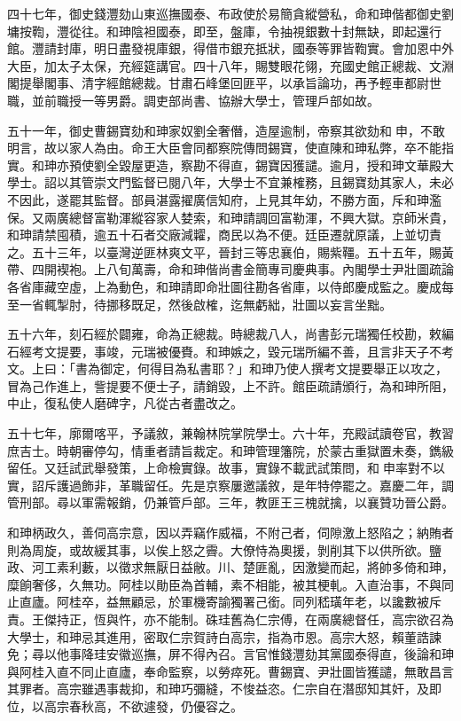 \begin{pinyinscope}
四十七年，御史錢灃劾山東巡撫國泰、布政使於易簡貪縱營私，命和珅偕都御史劉墉按鞫，灃從往。和珅陰袒國泰，即至，盤庫，令抽視銀數十封無缺，即起還行館。灃請封庫，明日盡發視庫銀，得借市銀充抵狀，國泰等罪皆鞫實。會加恩中外大臣，加太子太保，充經筵講官。四十八年，賜雙眼花翎，充國史館正總裁、文淵閣提舉閣事、清字經館總裁。甘肅石峰堡回匪平，以承旨論功，再予輕車都尉世職，並前職授一等男爵。調吏部尚書、協辦大學士，管理戶部如故。

五十一年，御史曹錫寶劾和珅家奴劉全奢僭，造屋逾制，帝察其欲劾和申，不敢明言，故以家人為由。命王大臣會同都察院傳問錫寶，使直陳和珅私弊，卒不能指實。和珅亦預使劉全毀屋更造，察勘不得直，錫寶因獲譴。逾月，授和珅文華殿大學士。詔以其管崇文門監督已閱八年，大學士不宜兼榷務，且錫寶劾其家人，未必不因此，遂罷其監督。部員湛露擢廣信知府，上見其年幼，不勝方面，斥和珅濫保。又兩廣總督富勒渾縱容家人婪索，和珅請調回富勒渾，不興大獄。京師米貴，和珅請禁囤積，逾五十石者交廠減糶，商民以為不便。廷臣遷就原議，上並切責之。五十三年，以臺灣逆匪林爽文平，晉封三等忠襄伯，賜紫韁。五十五年，賜黃帶、四開褉袍。上八旬萬壽，命和珅偕尚書金簡專司慶典事。內閣學士尹壯圖疏論各省庫藏空虛，上為動色，和珅請即命壯圖往勘各省庫，以侍郎慶成監之。慶成每至一省輒掣肘，待挪移既足，然後啟榷，迄無虧絀，壯圖以妄言坐黜。

五十六年，刻石經於闢雍，命為正總裁。時總裁八人，尚書彭元瑞獨任校勘，敕編石經考文提要，事竣，元瑞被優賚。和珅嫉之，毀元瑞所編不善，且言非天子不考文。上曰：「書為御定，何得目為私書耶？」和珅乃使人撰考文提要舉正以攻之，冒為己作進上，訾提要不便士子，請銷毀，上不許。館臣疏請頒行，為和珅所阻，中止，復私使人磨碑字，凡從古者盡改之。

五十七年，廓爾喀平，予議敘，兼翰林院掌院學士。六十年，充殿試讀卷官，教習庶吉士。時朝審停勾，情重者請旨裁定。和珅管理籓院，於蒙古重獄置未奏，鐫級留任。又廷試武舉發策，上命檢實錄。故事，實錄不載武試策問，和申率對不以實，詔斥護過飾非，革職留任。先是京察屢邀議敘，是年特停罷之。嘉慶二年，調管刑部。尋以軍需報銷，仍兼管戶部。三年，教匪王三槐就擒，以襄贊功晉公爵。

和珅柄政久，善伺高宗意，因以弄竊作威福，不附己者，伺隙激上怒陷之；納賄者則為周旋，或故緩其事，以俟上怒之霽。大僚恃為奧援，剝削其下以供所欲。鹽政、河工素利藪，以徵求無厭日益敝。川、楚匪亂，因激變而起，將帥多倚和珅，糜餉奢侈，久無功。阿桂以勛臣為首輔，素不相能，被其梗軋。入直治事，不與同止直廬。阿桂卒，益無顧忌，於軍機寄諭獨署己銜。同列嵇璜年老，以讒數被斥責。王傑持正，恆與忤，亦不能制。硃珪舊為仁宗傅，在兩廣總督任，高宗欲召為大學士，和珅忌其進用，密取仁宗賀詩白高宗，指為市恩。高宗大怒，賴董誥諫免；尋以他事降珪安徽巡撫，屏不得內召。言官惟錢灃劾其黨國泰得直，後論和珅與阿桂入直不同止直廬，奉命監察，以勞瘁死。曹錫寶、尹壯圖皆獲譴，無敢昌言其罪者。高宗雖遇事裁抑，和珅巧彌縫，不悛益恣。仁宗自在潛邸知其奸，及即位，以高宗春秋高，不欲遽發，仍優容之。


\end{pinyinscope}
